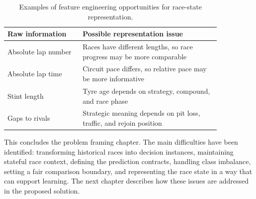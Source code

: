 \begin{table}[t]
    \centering
    \renewcommand{\arraystretch}{1.4}
    \caption{Examples of feature engineering opportunities for race-state representation.}
    \label{tab:feature_engineering_opportunities}
    \begin{tabular}{p{0.30\linewidth}p{0.55\linewidth}}
        \toprule
        Raw information & Possible representation issue \\
        \midrule
        Absolute lap number & Races have different lengths, so race progress may be more comparable \\
        Absolute lap time & Circuit pace differs, so relative pace may be more informative \\
        Stint length & Tyre age depends on strategy, compound, and race phase \\
        Gaps to rivals & Strategic meaning depends on pit loss, traffic, and rejoin position \\
        \bottomrule
    \end{tabular}
\end{table}
\FloatBarrier

This concludes the problem framing chapter. 
The main difficulties have been identified: transforming historical races into decision instances, maintaining stateful race context, defining the prediction contracts,
handling class imbalance, setting a fair comparison boundary, and representing the race state in a way that can support learning. 
The next chapter describes how these issues are addressed in the proposed solution.
